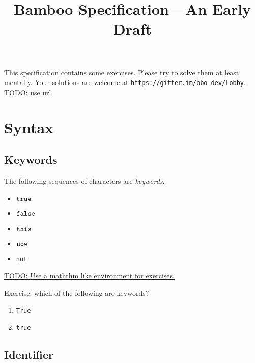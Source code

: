 \documentclass{book}
\title{Bamboo Specification---An Early Draft}
\newcommand{\todo}[1]{\underline{TODO: {#1}}}
\begin{document}
\maketitle

This specification contains some exercises.  Please try to solve them at least mentally.  Your solutions are welcome at \texttt{https://gitter.im/bbo-dev/Lobby}.  \todo{use url}

\chapter{Syntax}

\section{Keywords}

\newcommand{\true}{\text{\texttt{true}}}
\newcommand{\false}{\text{\texttt{false}}}
\newcommand{\msgsender}{\text{\texttt{msg.sender}}}
\newcommand{\msgvalue}{\text{\texttt{msg.value}}}
\newcommand{\this}{\text{\texttt{this}}}
\newcommand{\now}{\text{\texttt{now}}}
\newcommand{\paren}[1]{\mathtt{(}{#1}\mathtt{)}}
\newcommand{\logicalAnd}[2]{{#1}\mathbin{\text{\texttt{\&\&}}{#2}}}
\newcommand{\logicalNot}[1]{\mathop{\text{\texttt{not}}}{#1}}
\newcommand{\lt}[2]{{#1} \mathop{\text{\texttt{<}}} {#2}}
\newcommand{\gt}[2]{{#1} \mathop{\text{\texttt{>}}} {#2}}
\newcommand{\eq}[2]{{#1} \mathop{\text{\texttt{==}}} {#2}}
\newcommand{\notEq}[2]{{#1} \mathop{\text{\texttt{!=}}} {#2}}

The following sequences of characters are \textit{keywords}.
\begin{itemize}
\item $\true$
\item $\false$
\item $\this$
\item $\now$
\item \texttt{not}
\end{itemize}

\todo{Use a maththm like environment for exercises.}

Exercise: which of the following are keywords?
\begin{enumerate}
\item \texttt{True}
\item \texttt{true}
\end{enumerate}

\section{Identifier}
\end{document}
